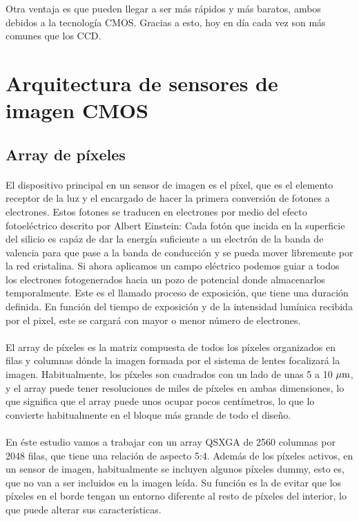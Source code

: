 Otra ventaja es que pueden llegar a ser más rápidos y más baratos, ambos debidos
a la tecnología CMOS. Gracias a esto, hoy en día cada vez son más comunes que los
CCD.

\section{Arquitectura de sensores de imagen CMOS}

\subsection{Array de píxeles}\label{cap:pxa_array}

\paragraph{}

El dispositivo principal en un sensor de imagen es el píxel, que es el elemento
receptor de la luz y el encargado de hacer la primera conversión de fotones a
electrones. Estos fotones se traducen en electrones por medio del efecto fotoeléctrico
descrito por Albert Einstein: Cada fotón que incida en la superficie del silicio
es capáz de dar la energía suficiente a un electrón de la banda de valencia para que
pase a la banda de conducción y se pueda mover libremente por la red cristalina.
Si ahora aplicamos un campo eléctrico podemos guiar a todos los electrones
fotogenerados hacia un pozo de potencial donde almacenarlos temporalmente. Este
es el llamado proceso de exposición, que tiene una duración definida. En función
del tiempo de exposición y de la intensidad lumínica recibida por el pixel, este
se cargará con mayor o menor número de electrones.

\paragraph{}
El array de píxeles es la matriz compuesta de todos los píxeles organizados en filas
y columnas dónde la imagen formada por el sistema de lentes focalizará la imagen.
Habitualmente, los píxeles son cuadrados con un lado de unas 5 a 10 $\mu\text{m}$, y el
array puede tener resoluciones de miles de píxeles en ambas dimensiones, lo que
significa que el array puede unos ocupar pocos centímetros, lo que lo convierte
habitualmente en el bloque más grande de todo el diseño.

\paragraph{}
En éste estudio vamos a trabajar con un array QSXGA de 2560 columnas por 2048 filas,
que tiene una relación de aspecto 5:4. Además de los píxeles activos, en un sensor
de imagen, habitualmente se incluyen algunos píxeles dummy, esto es, que no van
a ser incluidos en la imagen leída. Su función es la de evitar que los píxeles
en el borde tengan un entorno diferente al resto de píxeles del interior, lo que
puede alterar sus características.

